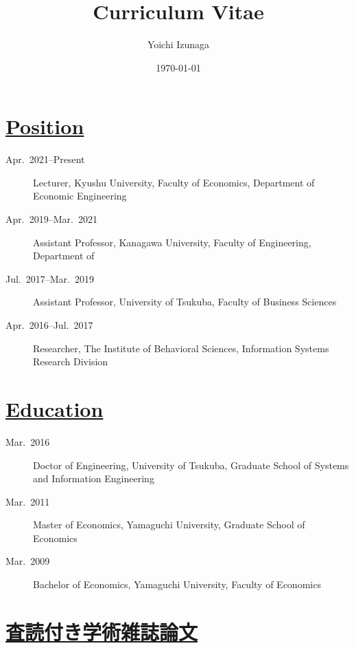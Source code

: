 \documentclass[dvipdfmx,9pt,a4paper]{article}
\title{Curriculum Vitae}
\author{Yoichi Izunaga}
\date{\today}
\begin{document}
\maketitle
\thispagestyle{mypagestyle}


\section*{\underline{Position}}
\begin{description}

\item[Apr.~2021--Present] Lecturer, Kyushu University, Faculty of Economics, Department of Economic Engineering

\item[Apr.~2019--Mar.~2021] Assistant Professor, Kanagawa University, Faculty of Engineering, Department of 

\item[Jul.~2017--Mar.~2019] Assistant Professor, University of Tsukuba, Faculty of Business Sciences

\item[Apr.~2016--Jul.~2017] Researcher, The Institute of Behavioral Sciences, Information Systems Research Division

\end{description}

\section*{\underline{Education}}
\begin{description}

\item[Mar.~2016] Doctor of Engineering, University of Tsukuba, Graduate School of Systems and Information Engineering

\item[Mar.~2011] Master of Economics, Yamaguchi University, Graduate School of Economics

\item[Mar.~2009] Bachelor of Economics, Yamaguchi University, Faculty of Economics

\end{description}


\section*{\underline{査読付き学術雑誌論文}}
\end{document}

